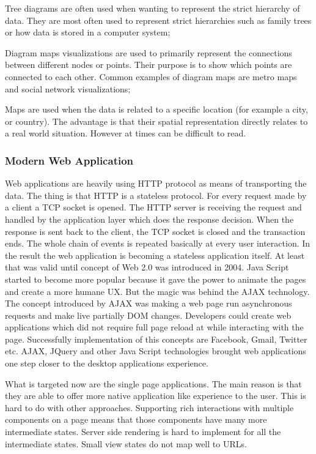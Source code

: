 \begin{description}
    \item Tree diagrams are often used when wanting to represent the strict hierarchy of data. They are most often used to represent strict hierarchies such as family trees or how data is stored in a computer system;

    \item Diagram maps visualizations are used to primarily represent the connections between different nodes or points. Their purpose is to show which points are connected to each other. Common examples of diagram maps are metro maps and social network visualizations;

    \item Maps are used when the data is related to a specific location (for example a city, or country). The advantage is that their spatial representation directly relates to a real world situation. However at times can be difficult to read.
\end{description}

\subsubsection{Modern Web Application}
Web applications are heavily using HTTP protocol as means of transporting the data. The thing is that HTTP is a stateless protocol. For every request made by a client a TCP socket is opened. The HTTP server is receiving the request and handled by the application layer which does the response decision. When the response is sent back to the client, the TCP socket is closed and the transaction ends. The whole chain of events is repeated basically at every user interaction. In the result the web application is becoming a stateless application itself. At least that was valid until concept of Web 2.0 was introduced in 2004. Java Script started to become more popular because it gave the power to animate the pages and create a more humane UX. But the magic was behind the AJAX technology. The concept introduced by AJAX was making a web page run asynchronous requests and make live partially DOM changes. Developers could create web applications which did not require full page reload at while interacting with the page. Successfully implementation of this concepts are Facebook, Gmail, Twitter etc. AJAX, JQuery and other Java Script technologies brought web applications one step closer to the desktop applications experience.

What is targeted now are the single page applications. The main reason is that they are able to offer more native application like experience to the user. This is hard to do with other approaches. Supporting rich interactions with multiple components on a page means that those components have many more intermediate states. Server side rendering is hard to implement for all the intermediate states. Small view states do not map well to URLs.

